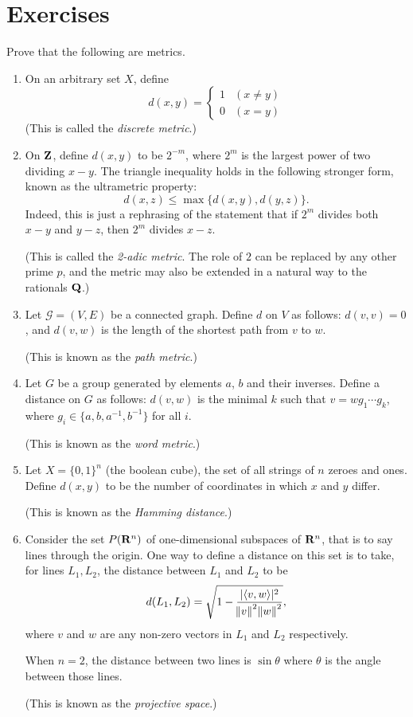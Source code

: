 \section*{Exercises}
\begin{prbm}
Prove that the following are metrics.
\begin{enumerate}[label=(\roman*)]
\item On an arbitrary set $X$, define
\[d(x,y)=\begin{cases}
1&(x\neq y)\\
0&(x=y)
\end{cases}\]
(This is called the \emph{discrete metric}.)

\item On $\mathbf Z$, define $d(x,y)$ to be $2^{-m}$, where $2^m$ is the largest power of two dividing $x-y$. The triangle inequality holds in the following stronger form, known as the ultrametric property:
\[d(x,z)\le\max\{d(x,y),d(y,z)\}.\]
Indeed, this is just a rephrasing of the statement that if $2^m$ divides both $x-y$ and $y-z$, then $2^m$ divides $x-z$.

(This is called the \emph{2-adic metric}. The role of $2$ can be replaced by any other prime $p$, and the metric may also be extended in a natural way to the rationals $\mathbf Q$.)

\item Let $\mathcal{G}=(V,E)$ be a connected graph. Define $d$ on $V$ as follows: $d(v,v)=0$, and $d(v,w)$ is the length of the shortest path from $v$ to $w$.

(This is known as the \emph{path metric}.)

\item Let $G$ be a group generated by elements $a$, $b$ and their inverses. Define a distance on $G$ as follows: $d(v,w)$ is the minimal $k$ such that $v=wg_1\cdots g_k$, where $g_i\in\{a,b,a^{-1},b^{-1}\}$ for all $i$.

(This is known as the \emph{word metric}.)

\item Let $X=\{0,1\}^n$ (the boolean cube), the set of all strings of $n$ zeroes and ones. Define $d(x,y)$ to be the number of coordinates in which $x$ and $y$ differ.

(This is known as the \emph{Hamming distance}.)

\item Consider the set $P(\mathbf R^n)$ of one-dimensional subspaces of $\mathbf R^n$, that is to say lines through the origin. One way to define a distance on this set is to take, for lines $L_1,L_2$, the distance between $L_1$ and $L_2$ to be
\[d(L_1,L_2)=\sqrt{1-\frac{|\langle v,w\rangle|^2}{\norm{v}^2\norm{w}^2}},\]
where $v$ and $w$ are any non-zero vectors in $L_1$ and $L_2$ respectively.

When $n=2$, the distance between two lines is $\sin\theta$ where $\theta$ is the angle between those lines.

(This is known as the \emph{projective space}.)
\end{enumerate}
\end{prbm}

